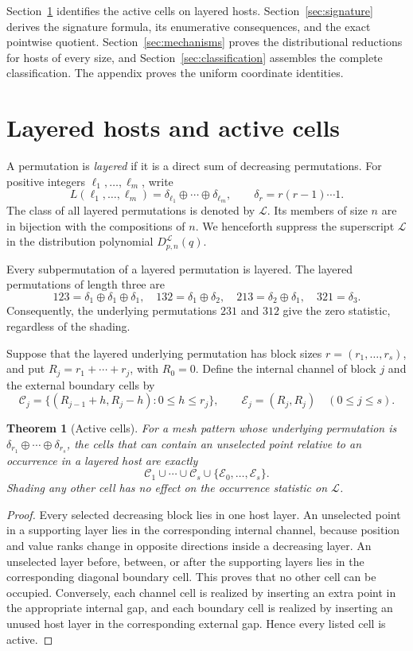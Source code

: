 \documentclass[12pt]{article}
\newtheorem{thm}{Theorem}[section]
\newcommand{\cL}{\mathcal L}
\begin{document}
Section~\ref{sec:active} identifies the active cells on layered hosts.
Section~\ref{sec:signature} derives the signature formula, its enumerative
consequences, and the exact pointwise quotient.
Section~\ref{sec:mechanisms} proves the distributional reductions
for hosts of every size,
and Section~\ref{sec:classification} assembles the complete classification.
The appendix proves the uniform coordinate identities.

\section{Layered hosts and active cells}\label{sec:active}

A permutation is \emph{layered} if it is a direct sum of decreasing
permutations.  For positive integers $\ell_1,\ldots,\ell_m$, write
\[
L(\ell_1,\ldots,\ell_m)
=\delta_{\ell_1}\oplus\cdots\oplus\delta_{\ell_m},
\qquad \delta_r=r(r-1)\cdots1.
\]
The class of all layered permutations is denoted by $\cL$.  Its members of
size $n$ are in bijection with the compositions of $n$.  We henceforth
suppress the superscript $\cL$ in the distribution polynomial
$D^{\cL}_{p,n}(q)$.

Every subpermutation of a layered permutation is layered.  The layered
permutations of length three are
\[
123=\delta_1\oplus\delta_1\oplus\delta_1,
\quad132=\delta_1\oplus\delta_2,
\quad213=\delta_2\oplus\delta_1,
\quad321=\delta_3.
\]
Consequently, the underlying permutations $231$ and $312$ give the zero
statistic, regardless of the shading.

Suppose that the layered underlying permutation has block sizes
$r=(r_1,\ldots,r_s)$, and put $R_j=r_1+\cdots+r_j$, with $R_0=0$.  Define the
internal channel of block $j$ and the external boundary cells by
\[
\mathcal C_j=\{(R_{j-1}+h,R_j-h):0\le h\le r_j\},
\qquad \mathcal E_j=(R_j,R_j)\quad(0\le j\le s).
\]

\begin{thm}[Active cells]\label{thm:active}
For a mesh pattern whose underlying permutation is
$\delta_{r_1}\oplus\cdots\oplus\delta_{r_s}$, the cells that can contain an
unselected point relative to an occurrence in a layered host are exactly
\[
\mathcal C_1\cup\cdots\cup\mathcal C_s
\cup\{\mathcal E_0,\ldots,\mathcal E_s\}.
\]
Shading any other cell has no effect on the occurrence statistic on $\cL$.
\end{thm}

\begin{proof}
Every selected decreasing block lies in one host layer.  An unselected point
in a supporting layer lies in the corresponding internal channel, because
position and value ranks change in opposite directions inside a decreasing
layer.  An unselected layer before, between, or after the supporting layers
lies in the corresponding diagonal boundary cell.  This proves that no other
cell can be occupied.  Conversely, each channel cell is realized by inserting
an extra point in the appropriate internal gap, and each boundary cell is
realized by inserting an unused host layer in the corresponding external
gap.  Hence every listed cell is active.
\end{proof}
\end{document}
